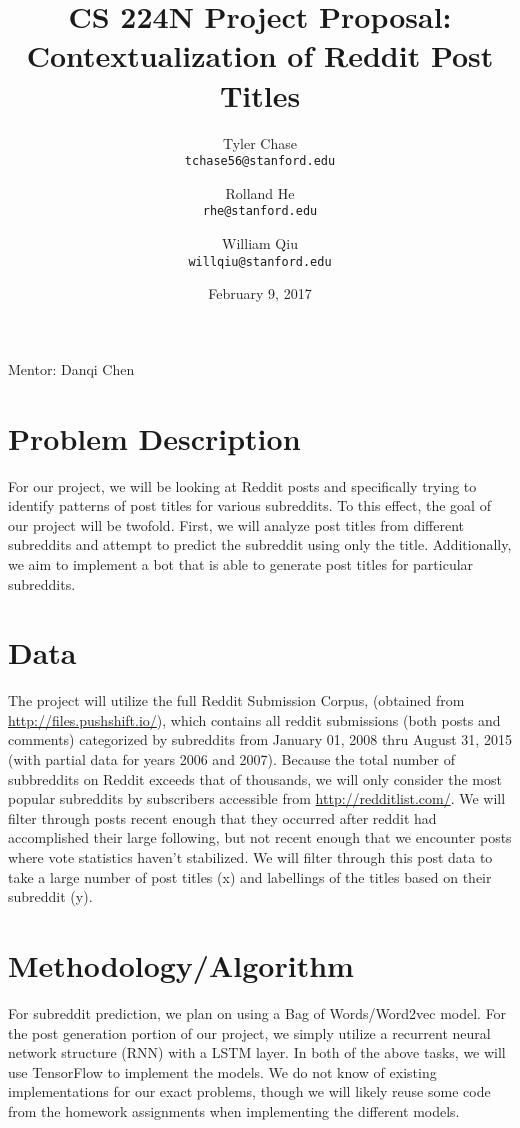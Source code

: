\documentclass[11pt]{article}
\title{\vspace{-2cm}CS 224N Project Proposal:\\ Contextualization of Reddit Post Titles}
\author{Tyler Chase \\ \texttt{tchase56@stanford.edu} \and
  Rolland He \\ \texttt{rhe@stanford.edu} \and
  William Qiu \\ \texttt{willqiu@stanford.edu}}
\date{February 9, 2017}
\begin{document}
\maketitle

Mentor: Danqi Chen

\section*{Problem Description}

For our project, we will be looking at Reddit posts and specifically trying to identify patterns of post titles for various subreddits. To this effect, the goal of our project will be twofold. First, we will analyze post titles from different subreddits and attempt to predict the subreddit using only the title. Additionally, we aim to implement a bot that is able to generate post titles for particular subreddits. 

\section*{Data}

The project will utilize the full Reddit Submission Corpus, (obtained from  \url{http://files.pushshift.io/}), which contains all reddit submissions (both posts and comments) categorized by subreddits from January 01, 2008 thru August 31, 2015 (with partial data for years 2006 and 2007). Because the total number of subbreddits on Reddit exceeds that of thousands, we will only consider the most popular subreddits by subscribers accessible from \url{http://redditlist.com/}. We will filter through posts recent enough that they occurred after reddit had accomplished their large following, but not recent enough that we encounter posts where vote statistics haven't stabilized. We will filter through this post data to take a large number of post titles (x) and labellings of the titles based on their subreddit (y).


\section*{Methodology/Algorithm}
For subreddit prediction, we plan on using a Bag of Words/Word2vec model. For the post generation portion of our project, we simply utilize a recurrent neural network structure (RNN) with a LSTM layer. In both of the above tasks, we will use TensorFlow to implement the models. We do not know of existing implementations for our exact problems, though we will likely reuse some code from the homework assignments when implementing the different models.
\end{document}
